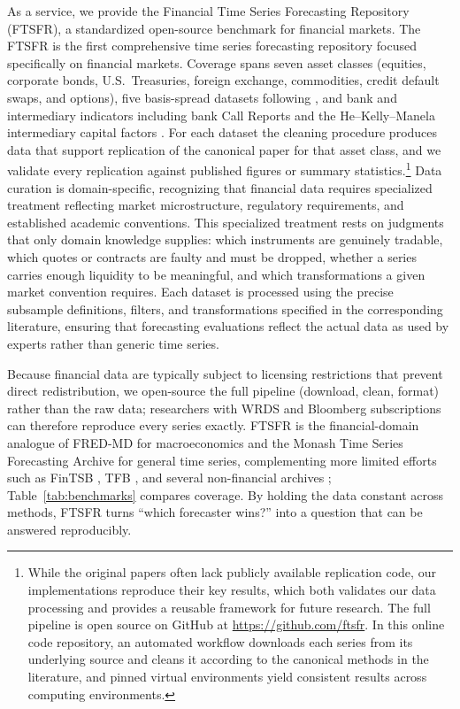 \documentclass{article}
\begin{document}
As a service, we provide the Financial Time Series Forecasting Repository (FTSFR), a standardized open-source benchmark for financial markets. The FTSFR is the first comprehensive time series forecasting repository focused specifically on financial markets. Coverage spans seven asset classes (equities, corporate bonds, U.S.~Treasuries, foreign exchange, commodities, credit default swaps, and options), five basis-spread datasets following \citet{Siriwardane2021}, and bank and intermediary indicators including bank Call Reports \citep{Drechsler2017} and the He--Kelly--Manela intermediary capital factors \citep{He2017}. For each dataset the cleaning procedure produces data that support replication of the canonical paper for that asset class, and we validate every replication against published figures or summary statistics.\footnote{While the original papers often lack publicly available replication code, our implementations reproduce their key results, which both validates our data processing and provides a reusable framework for future research. The full pipeline is open source on GitHub at \url{https://github.com/ftsfr}. In this online code repository, an automated workflow downloads each series from its underlying source and cleans it according to the canonical methods in the literature, and pinned virtual environments yield consistent results across computing environments.} Data curation is domain-specific, recognizing that financial data requires specialized treatment reflecting market microstructure, regulatory requirements, and established academic conventions. This specialized treatment rests on judgments that only domain knowledge supplies: which instruments are genuinely tradable, which quotes or contracts are faulty and must be dropped, whether a series carries enough liquidity to be meaningful, and which transformations a given market convention requires. Each dataset is processed using the precise subsample definitions, filters, and transformations specified in the corresponding literature, ensuring that forecasting evaluations reflect the actual data as used by experts rather than generic time series.


Because financial data are typically subject to licensing restrictions that prevent direct redistribution, we open-source the full pipeline (download, clean, format) rather than the raw data; researchers with WRDS and Bloomberg subscriptions can therefore reproduce every series exactly. FTSFR is the financial-domain analogue of FRED-MD \citep{McCracken2016} for macroeconomics and the Monash Time Series Forecasting Archive \citep{Godahewa2021} for general time series, complementing more limited efforts such as FinTSB \citep{Hu2018}, TFB \citep{Qiu2024}, and several non-financial archives \citep{Dau2019, Bagnall2018, Tan2020}; Table~\ref{tab:benchmarks} compares coverage. By holding the data constant across methods, FTSFR turns ``which forecaster wins?'' into a question that can be answered reproducibly. 
\end{document}
